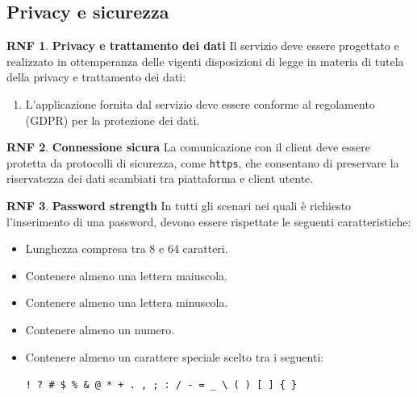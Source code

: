 \documentclass[11pt, a4paper]{article}
\theoremstyle{definition}
\newtheorem{nonfuncreq}{RNF} %
\begin{document}
\subsection{Privacy e sicurezza}

\begin{nonfuncreq}
\textbf{Privacy e trattamento dei dati }
Il servizio deve essere progettato e realizzato in ottemperanza delle
vigenti disposizioni di legge in materia di tutela della privacy e
trattamento dei dati:
\begin{enumerate}
    \item L'applicazione fornita dal servizio deve essere conforme
    al regolamento \href{https://www.garanteprivacy.it/documents/10160/0/Regolamento+UE+2016+679.+Arricchito+con+riferimenti+ai+Considerando+Aggiornato+alle+rettifiche+pubblicate+sulla+Gazzetta+Ufficiale++dell%27Unione+europea+127+del+23+maggio+2018}{\textcolor{blue}{\underbar{UE n.2016/679}}} (GDPR) per la protezione dei dati.
\end{enumerate}
\end{nonfuncreq}

\begin{nonfuncreq}
\textbf{Connessione sicura }
La comunicazione con il client deve essere protetta da protocolli
di sicurezza, come \texttt{https}, che consentano di preservare la
riservatezza dei dati scambiati tra piattaforma e client utente.
\end{nonfuncreq}

\begin{nonfuncreq}
\label{legalpassword}
\textbf{Password strength }
In tutti gli scenari nei quali è richiesto l'inserimento di una password,
devono essere rispettate le seguenti caratteristiche:
\begin{itemize}
    \item Lunghezza compresa tra 8 e 64 caratteri.
    \item Contenere almeno una lettera maiuscola.
    \item Contenere almeno una lettera minuscola.
    \item Contenere almeno un numero.
    \item Contenere almeno un carattere speciale scelto tra i
    seguenti:
    \begin{center}
        \verb|! ? # $ % & @ * + . , ; : / - = _ \ ( ) [ ] { }|
    \end{center}
\end{itemize}
\end{nonfuncreq}
\end{document}
